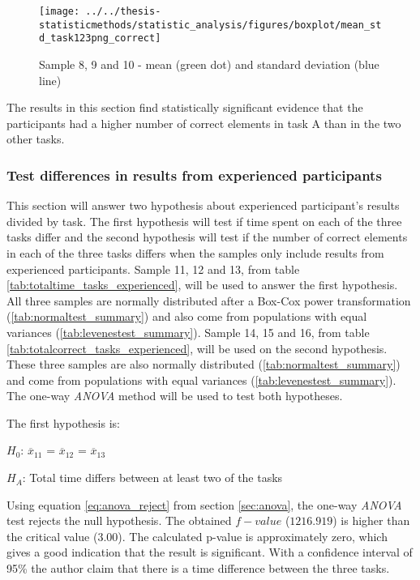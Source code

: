 \begin{figure}[H]
	\centering
	\texttt{[image: ../../thesis-statisticmethods/statistic\_analysis/figures/boxplot/mean\_std\_task123png\_correct]}
	\caption{Sample 8, 9 and 10 - mean (green dot) and standard deviation (blue line)}
	\label{fig:meanstdtask123pngcorrect}
\end{figure}

\vspace{0.3cm}

The results in this section find statistically significant evidence that the participants had a higher number of correct elements in task A than in the two other tasks.

\subsubsection[Sample 11 - 16]{Test differences in results from experienced participants}\label{sec:sample_11_12_13_anova}
This section will answer two hypothesis about experienced participant's results divided by task. The first hypothesis will test if time spent on each of the three tasks differ and the second hypothesis will test if the number of correct elements in each of the three tasks differs when the samples only include results from experienced participants. Sample 11, 12 and 13, from table \ref{tab:totaltime_tasks_experienced}, will be used to answer the first hypothesis. All three samples are normally distributed after a Box-Cox power transformation (\ref{tab:normaltest_summary}) and also come from populations with equal variances (\ref{tab:levenestest_summary}). Sample 14, 15 and 16, from table \ref{tab:totalcorrect_tasks_experienced}, will be used on the second hypothesis. These three samples are also normally distributed (\ref{tab:normaltest_summary}) and come from populations with equal variances (\ref{tab:levenestest_summary}). The one-way \textit{ANOVA} method will be used to test both hypotheses. 

The first hypothesis is:\\
\centerline{$H_{0}$: $\overline{x}_{11}$ = $\overline{x}_{12}$ = $\overline{x}_{13}$}
\centerline{$H_{A}$: Total time differs between at least two of the tasks}
\vspace{0.2cm}

Using equation \ref{eq:anova_reject}  from section \ref{sec:anova}, the one-way \textit{ANOVA} test rejects the null hypothesis. The obtained $f-value$ ($1216.919$) is higher than the critical value ($3.00$). The calculated p-value is approximately zero, which gives a good indication that the result is significant. With a confidence interval of 95\% the author claim that there is a time difference between the three tasks. 


